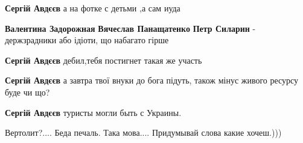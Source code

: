 \begin{itemize}
\begin{itemize}
\textbf{Сергій Авдєєв} а на фотке с детьми ,а сам иуда

\begin{itemize}
 
\textbf{Валентина Задорожная} \textbf{Вячеслав Панащатенко}
\textbf{Петр Силарин} - держзрадники або ідіоти, що набагато гірше
\end{itemize}

 
\textbf{Сергій Авдєєв} дебил,тебя постигнет такая же участь

 
\textbf{Сергій Авдєєв} а завтра твої внуки до бога підуть, також мінус живого ресурсу буде чи що?

 
\textbf{Сергій Авдєєв} туристы могли быть с Украины.

\end{itemize}

 
Вертолит?.... Беда печаль. Така мова.... Придумывай слова какие хочеш.)))

\begin{itemize}
 

\end{itemize}
\end{itemize}
